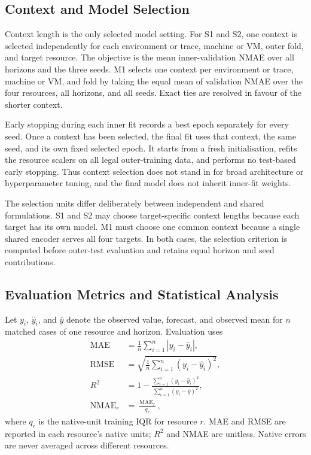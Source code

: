 \documentclass[a4paper,fleqn]{cas-dc}
\begin{document}
\subsection{Context and Model Selection}
\label{sec:model-selection}

Context length is the only selected model setting.  For S1 and S2, one context
is selected independently for each environment or trace, machine or VM, outer
fold, and target resource.  The objective is the mean inner-validation NMAE
over all horizons and the three seeds.  M1 selects one context per environment
or trace, machine or VM, and fold by taking the equal mean of validation NMAE
over the four resources, all horizons, and all seeds.  Exact ties are resolved
in favour of the shorter context.

Early stopping during each inner fit records a best epoch separately for every
seed.  Once a context has been selected, the final fit uses that context, the
same seed, and its own fixed selected epoch.  It starts from a fresh
initialisation, refits the resource scalers on all legal outer-training data,
and performs no test-based early stopping.  Thus context selection does not
stand in for broad architecture or hyperparameter tuning, and the final model
does not inherit inner-fit weights.

The selection units differ deliberately between independent and shared
formulations.  S1 and S2 may choose target-specific context lengths because
each target has its own model.  M1 must choose one common context because a
single shared encoder serves all four targets.  In both cases, the selection
criterion is computed before outer-test evaluation and retains equal horizon
and seed contributions.

\subsection{Evaluation Metrics and Statistical Analysis}
\label{sec:evaluation}

Let $y_i$, $\widehat{y}_i$, and $\overline{y}$ denote the observed value,
forecast, and observed mean for $n$ matched cases of one resource and horizon.
Evaluation uses
\begin{equation}
  \begin{aligned}
    \operatorname{MAE} &= \frac{1}{n}\sum_{i=1}^{n}|y_i-\widehat{y}_i|, \\
    \operatorname{RMSE} &=
      \sqrt{\frac{1}{n}\sum_{i=1}^{n}(y_i-\widehat{y}_i)^2}, \\
    R^2 &= 1-
      \frac{\sum_{i=1}^{n}(y_i-\widehat{y}_i)^2}
           {\sum_{i=1}^{n}(y_i-\overline{y})^2}, \\
    \operatorname{NMAE}_r &= \frac{\operatorname{MAE}_r}{q_r},
  \end{aligned}
  \label{eq:evaluation-metrics}
\end{equation}
where $q_r$ is the native-unit training IQR for resource $r$.  MAE and RMSE are
reported in each resource's native units; $R^2$ and NMAE are unitless.  Native
errors are never averaged across different resources.
\end{document}
